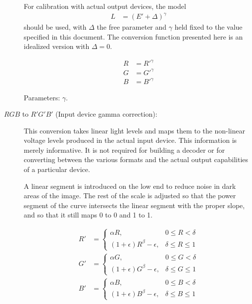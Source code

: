 \documentclass[11pt,letterpaper]{book}
\numberwithin{equation}{chapter}
\numberwithin{figure}{chapter}
\numberwithin{table}{chapter}
\begin{document}
\begin{description}
For calibration with actual output devices, the model
\begin{align}
L & =(E'+\Delta)^\gamma
\end{align}
 should be used, with $\Delta$ the free parameter and $\gamma$ held fixed to
 the value specified in this document.
The conversion function presented here is an idealized version with $\Delta=0$.

\begin{align}
R & = R'^\gamma \\
G & = G'^\gamma \\
B & = B'^\gamma
\end{align}

Parameters: $\gamma$.

\item[$RGB$ to $R'G'B'$ (Input device gamma correction):]
\vspace{\baselineskip}\hfill


This conversion takes linear light levels and maps them to the non-linear
 voltage levels produced in the actual input device.
This information is merely informative.
It is not required for building a decoder or for converting between the various
 formats and the actual output capabilities of a particular device.

A linear segment is introduced on the low end to reduce noise in dark areas of
 the image.
The rest of the scale is adjusted so that the power segment of the curve
 intersects the linear segment with the proper slope, and so that it still maps
 0 to 0 and 1 to 1.

\begin{align}
R' & = \left\{
\begin{array}{ll}
\alpha R,                     & 0\le R<\delta   \\
(1+\epsilon)R^\beta-\epsilon, & \delta\le R\le1
\end{array}\right. \\
G' & = \left\{
\begin{array}{ll}
\alpha G,                     & 0\le G<\delta   \\
(1+\epsilon)G^\beta-\epsilon, & \delta\le G\le1
\end{array}\right. \\
B' & = \left\{
\begin{array}{ll}
\alpha B,                     & 0\le B<\delta   \\
(1+\epsilon)B^\beta-\epsilon, & \delta\le B\le1
\end{array}\right.
\end{align}


\end{description}
\end{document}

